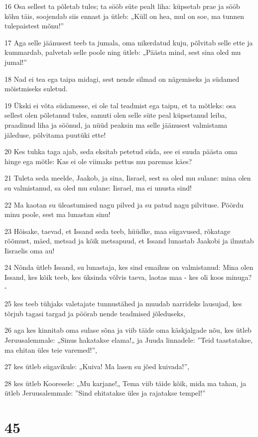 \par 16 Osa sellest ta põletab tules; ta sööb süte pealt liha: küpsetab prae ja sööb kõhu täis, soojendab siis ennast ja ütleb: „Küll on hea, mul on soe, ma tunnen tulepaistest mõnu!”
\par 17 Aga selle jäänusest teeb ta jumala, oma nikerdatud kuju, põlvitab selle ette ja kummardab, palvetab selle poole ning ütleb: „Päästa mind, sest sina oled mu jumal!”
\par 18 Nad ei tea ega taipa midagi, sest nende silmad on nägemiseks ja südamed mõistmiseks suletud.
\par 19 Ükski ei võta südamesse, ei ole tal teadmist ega taipu, et ta mõtleks: osa sellest olen põletanud tules, samuti olen selle süte peal küpsetanud leiba, praadinud liha ja söönud, ja nüüd peaksin ma selle jäänusest valmistama jäleduse, põlvitama puutüki ette!
\par 20 Kes tuhka taga ajab, seda eksitab petetud süda, see ei suuda päästa oma hinge ega mõtle: Kas ei ole viimaks pettus mu paremas käes?
\par 21 Tuleta seda meelde, Jaakob, ja sina, Iisrael, sest sa oled mu sulane: mina olen su valmistanud, sa oled mu sulane: Iisrael, ma ei unusta sind!
\par 22 Ma kaotan su üleastumised nagu pilved ja su patud nagu pilvituse. Pöördu minu poole, sest ma lunastan sinu!
\par 23 Hõisake, taevad, et Issand seda teeb, hüüdke, maa sügavused, rõkatage rõõmust, mäed, metsad ja kõik metsapuud, et Issand lunastab Jaakobi ja ilmutab Iisraelis oma au!
\par 24 Nõnda ütleb Issand, su lunastaja, kes sind emaihus on valmistanud: Mina olen Issand, kes kõik teeb, kes üksinda võlvis taeva, laotas maa - kes oli koos minuga? -
\par 25 kes teeb tühjaks valetajate tunnustähed ja muudab narrideks lausujad, kes tõrjub tagasi targad ja pöörab nende teadmised jõleduseks,
\par 26 aga kes kinnitab oma sulase sõna ja viib täide oma käskjalgade nõu, kes ütleb Jeruusalemmale: „Sinus hakatakse elama!„ ja Juuda linnadele: ”Teid taastatakse, ma ehitan üles teie varemed!”,
\par 27 kes ütleb sügavikule: „Kuiva! Ma lasen su jõed kuivada!”,
\par 28 kes ütleb Kooresele: „Mu karjane!„ Tema viib täide kõik, mida ma tahan, ja ütleb Jeruusalemmale: ”Sind ehitatakse üles ja rajatakse tempel!”

\chapter{45}

